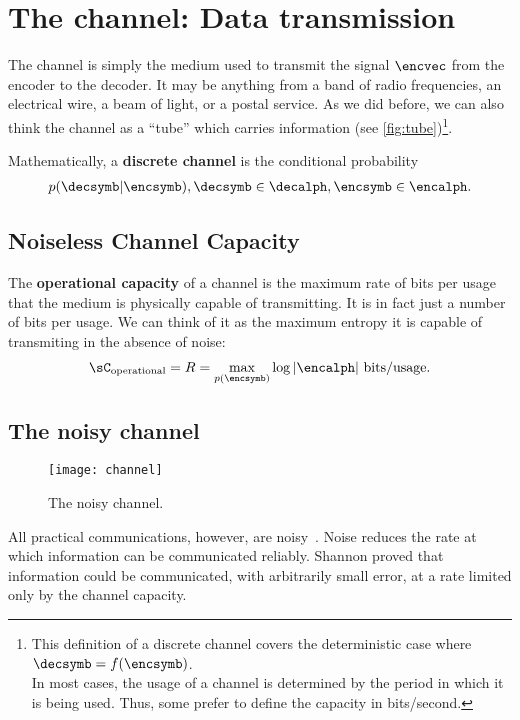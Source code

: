 \section{The channel: Data transmission} The channel is simply the medium used to transmit the signal \(\encvec\) from the encoder to the decoder. It may be anything from a band of radio frequencies, an electrical wire, a beam of light, or a postal service. As we did before, we can also think the channel as a ``tube'' which carries information (see \cref{fig:tube})\footnote{This definition of a discrete channel covers the deterministic case where \(\decsymb = f(\encsymb)\).\\ In most cases, the usage of a channel is determined by the period in which it is being used.  Thus, some prefer to define the capacity in bits/second.}.

\begin{definition}
	Mathematically, a \textbf{discrete channel} is the conditional probability
	\begin{align}
		p(\decsymb|\encsymb), \decsymb \in \decalph, \encsymb \in \encalph.
	\end{align}
\end{definition}
\subsection{Noiseless Channel Capacity}
\begin{definition}
	The \textbf{operational capacity} of a channel is the maximum rate of bits per usage that the medium is physically capable of transmitting. It is in fact just a number of bits per usage. We can think of it as the maximum entropy it is capable of transmiting in the absence of noise:
	\begin{align}
		\sC_{\text{operational}}= R = \max_{p(\encsymb)} \log |\encalph| \text{ bits/usage}.
	\end{align}
\end{definition}

\subsection{The noisy channel}
\begin{figure}
	[hbt!] \centering
	\texttt{[image: channel]}
	\caption{The noisy channel.}
\end{figure}
 All practical communications, however, are noisy~\cite{stone:2015}. Noise reduces the rate at which information can be communicated reliably. Shannon proved that information could be communicated, with arbitrarily small error, at a rate limited only by the channel capacity.

